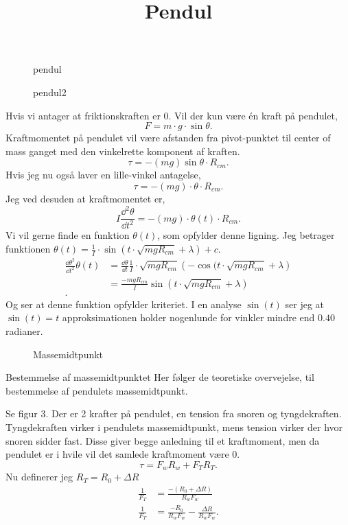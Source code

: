 
\title{\vspace{-1cm}Pendul\vspace{-1cm}}
\author{}
\date{}


\maketitle
\thispagestyle{fancy}
\begin{figure}[ht]
    \centering
    \caption{pendul}
    \label{fig:pendul}
\end{figure}
\begin{figure}[ht]
    \centering
    \caption{pendul2}
    \label{fig:pendul2}
\end{figure}
Hvis vi antager at friktionskraften er $0$. Vil der kun være én kraft på pendulet,
 \[
F = m\cdot g\cdot \sin \theta
.\]
Kraftmomentet på pendulet vil være afstanden fra pivot-punktet til center of mass ganget med den vinkelrette komponent af kraften. 
\[
	\tau = -(mg)\sin \theta \cdot R_{cm}
.\] 
Hvis jeg nu også laver en lille-vinkel antagelse,
\[
	\tau = -(mg) \cdot \theta \cdot R_{cm}
.\]
Jeg ved desuden at kraftmomentet er,
\[
	I \frac{\dd^2 \theta}{\dd t^2} = -(mg)\cdot \theta(t)\cdot  R_{cm}
.\] 
 Vi vil gerne finde en funktion $\theta(t)$, som opfylder denne ligning. Jeg betrager funktionen $\theta (t) = \frac{1}{I}\cdot \sin(t\cdot \sqrt{mgR_{cm}}+\lambda )+c$.
\begin{align*}
	\frac{\dd \theta^2}{\dd t^2} \theta (t) &= \frac{\dd \theta}{\dd t}\frac{1}{I}\cdot \sqrt{mgR_{cm}}\left( -\cos(t\cdot \sqrt{mgR_{cm}} +\lambda \right)  \\
						&= \frac{-mgR_{cm}}{I}\sin(t\cdot \sqrt{mgR_{cm}} +\lambda) \\
.\end{align*}
Og ser at denne funktion opfylder kriteriet. I en analyse $\sin(t)$ ser jeg at $\sin(t) = t$ approksimationen holder nogenlunde for vinkler mindre end $0.40$ radianer.
\begin{figure}[ht]
    \centering
    \caption{Massemidtpunkt}
    \label{fig:massemidtpunkt}
\end{figure}
\newpage
\begin{subexercise}{Bestemmelse af massemidtpunktet}
Her følger de teoretiske overvejelse, til bestemmelse af pendulets massemidtpunkt.
\end{subexercise}\newline
Se figur 3. Der er 2 krafter på pendulet, en tension fra snoren og tyngdekraften. Tyngdekraften virker i pendulets massemidtpunkt, mens tension virker der hvor snoren sidder fast. Disse giver begge anledning til et kraftmoment, men da pendulet er i hvile vil det samlede kraftmoment være 0.
\[
\tau = F_wR_w + F_TR_T
.\] 
Nu definerer jeg $R_T = R_0 + \Delta R$
\begin{align*}
	\frac{1}{F_T}&= \frac{-\left( R_0+\Delta R \right) }{R_wF_w} \\
	\frac{1}{F_T}&= \frac{-R_0}{R_wF_w}-\frac{\Delta R}{R_wF_w}
.\end{align*} 

